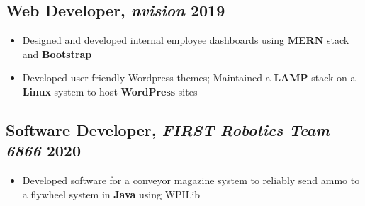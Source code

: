 \documentclass[9pt]{article}
\begin{document}
\subsection{Web Developer, \textit{nvision} \hfill \normalsize\textnormal{2019}}
\begin{itemize}
  \item Designed and developed internal employee dashboards using \textbf{MERN} stack and \textbf{Bootstrap} 
  \item Developed user-friendly Wordpress themes; Maintained a \textbf{LAMP} stack on a \textbf{Linux} system to host \textbf{WordPress} sites
\end{itemize}


\subsection{Software Developer, \textit{FIRST Robotics Team 6866} \hfill \normalsize\textnormal{2020}}
\begin{itemize}
  \item Developed software for a conveyor magazine system to reliably send ammo to a flywheel system in \textbf{Java} using WPILib
\end{itemize}


\end{document}
